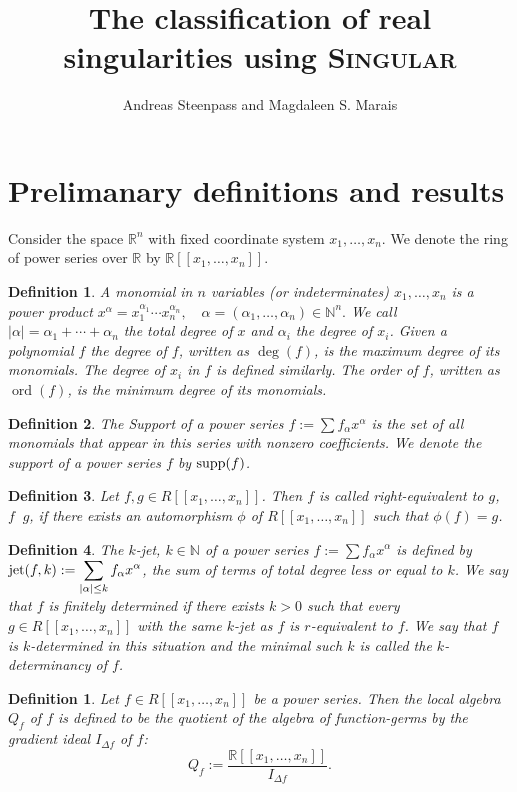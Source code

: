 \documentclass{amsproc}
\title{The classification of real singularities using \textsc{Singular}}
\author{Andreas Steenpass and Magdaleen S. Marais}
\DeclareMathOperator{\ord}{ord}
\DeclareMathOperator{\requiv}{\overset{r}{\sim}}
\begin{document}
\begin{abstract}
\end{abstract}
\maketitle
\section{Prelimanary definitions and results}
Consider the space $\mathbb R^n$ with fixed coordinate system $x_1,\ldots,x_n$. We denote the ring of power series over $\mathbb R$ by $\mathbb R[[x_1,\ldots,x_n]]$.
\newtheorem{Monomial}{Definition}[section]
\begin{Monomial}\label{Monomial}
A monomial in $n$ variables (or indeterminates) $x_1,\ldots,x_n$ is a power product
$x^{\alpha}=x_1^{\alpha_1}\cdots
x_n^{\alpha_n},\quad\alpha=(\alpha_1,\ldots,\alpha_n)\in\mathbb N^n.$ We call
$|\alpha|=\alpha_1+\cdots+\alpha_n$ the total degree of $x$ and $\alpha_i$ the
degree of $x_i$. Given a polynomial $f$ the degree of $f$, written as $\deg(f)$,
is the maximum degree of its monomials. The degree of $x_i$ in $f$ is defined
similarly. The order of $f$, written as $\ord(f)$, is the minimum degree of its monomials. 
\end{Monomial}
\newtheorem{Support}[Monomial]{Definition}
\begin{Support}
The Support of a power series $f:=\sum f_\alpha  x^{\alpha}$ is the set of all monomials that appear in this series with nonzero coefficients. We denote the support of a power series $f$ by $\textnormal{supp}(f)$.
\end{Support}
\newtheorem{r-equiv}[Monomial]{Definition}
\begin{r-equiv}\label{r-equiv}
Let $f,g\in R[[x_1,\ldots,x_n]]$. Then $f$ is called right-equivalent to $g$, $f
\requiv g$, if there exists an automorphism  $\phi$ of $R[[x_1,\ldots,x_n]]$ such that $\phi(f)=g$.
\end{r-equiv}
\newtheorem{jet}[Monomial]{Definition}
\begin{jet}\label{jet}
The $k$-jet, $k\in\mathbb N$ of a power series $f:=\sum f_\alpha  x^{\alpha}$ is
defined by $\displaystyle\textnormal{jet}(f,k):=\sum_{|\alpha|\le
k}f_{\alpha}x^{\alpha}$, the sum of terms of total degree less or equal to $k$.
We say that $f$ is finitely determined if there exists $k>0$ such that every
$g\in R[[x_1,\ldots,x_n]]$ with the same $k$-jet as $f$ is $r$-equivalent to $f$.  We say that $f$ is $k$-determined in this situation and the minimal such $k$ is called the $k$-determinancy of $f$.
\end{jet}
\newtheorem{LocalAlgebra}{Definition}
\begin{LocalAlgebra}\label{LocalAlgebra}
Let $f \in R[[x_1, \ldots, x_n]]$ be a power series. Then
the local algebra $Q_f$ of $f$ is defined to be the quotient of the algebra of function-germs by the gradient ideal $I_{\Delta f}$ of $f$:
\[Q_f:=\frac{\mathbb R[[x_1,\ldots,x_n]]}{I_{\Delta f}}.\]
\end{LocalAlgebra}
\end{document}
